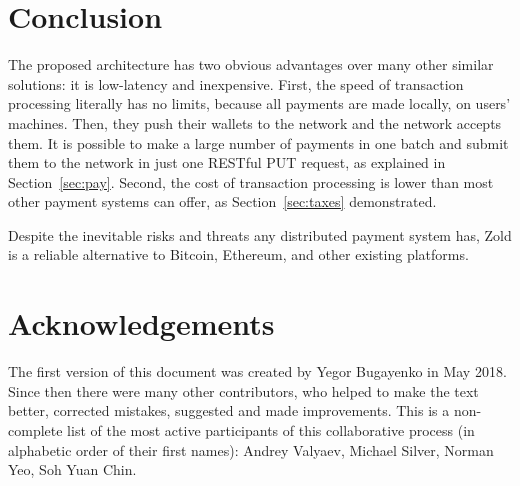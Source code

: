 \documentclass{main}
\begin{document}
\section{Conclusion}

The proposed architecture has two obvious advantages over many other
similar solutions: it is low-latency and inexpensive. First, the speed of transaction processing
literally has no limits, because all payments are made locally, on users'
machines. Then, they push their wallets to the network and the network accepts
them. It is possible to make a large number of payments in one batch and
submit them to the network in just one RESTful PUT request, as explained
in Section~\ref{sec:pay}. Second, the cost of transaction processing
is lower than most other payment systems can offer, as Section~\ref{sec:taxes}
demonstrated.

Despite the inevitable risks and threats any distributed payment system
has, Zold is a reliable alternative to Bitcoin, Ethereum, and
other existing platforms.

\section{Acknowledgements}

The first version of this document was created by Yegor Bugayenko in May 2018.
Since then there were many other contributors, who helped to make the text better,
corrected mistakes, suggested and made improvements. This is a non-complete list
of the most active participants of this collaborative process
(in alphabetic order of their first names):
%
Andrey Valyaev,
Michael Silver,
Norman Yeo,
Soh Yuan Chin.

\raggedright
\printbibliography%
\end{document}
